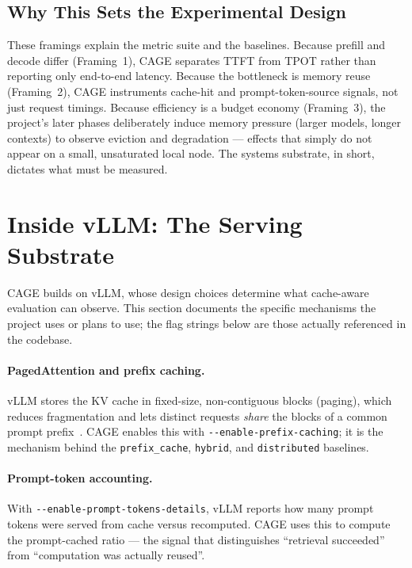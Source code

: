 \documentclass[12pt,a4paper]{article}
\let\cite\citep
\begin{document}
\subsection{Why This Sets the Experimental Design}

These framings explain the metric suite and the baselines. Because prefill and
decode differ (Framing~1), CAGE separates TTFT from TPOT rather than reporting only
end-to-end latency. Because the bottleneck is memory reuse (Framing~2), CAGE
instruments cache-hit and prompt-token-source signals, not just request timings.
Because efficiency is a budget economy (Framing~3), the project's later phases
deliberately induce memory pressure (larger models, longer contexts) to observe
eviction and degradation --- effects that simply do not appear on a small,
unsaturated local node. The systems substrate, in short, dictates what must be
measured.

\section{Inside vLLM: The Serving Substrate}
\label{sec:vllm}

CAGE builds on vLLM, whose design choices determine what cache-aware evaluation
can observe. This section documents the specific mechanisms the project uses or
plans to use; the flag strings below are those actually referenced in the
codebase.

\paragraph{PagedAttention and prefix caching.} vLLM stores the KV cache in
fixed-size, non-contiguous blocks (paging), which reduces fragmentation and lets
distinct requests \emph{share} the blocks of a common prompt
prefix~\cite{kwon2023efficient}. CAGE enables this with
\texttt{-{}-enable-prefix-caching}; it is the mechanism behind the
\texttt{prefix\_cache}, \texttt{hybrid}, and \texttt{distributed} baselines.

\paragraph{Prompt-token accounting.} With \texttt{-{}-enable-prompt-tokens-details},
vLLM reports how many prompt tokens were served from cache versus recomputed. CAGE
uses this to compute the prompt-cached ratio --- the signal that distinguishes
``retrieval succeeded'' from ``computation was actually reused''.
\end{document}
